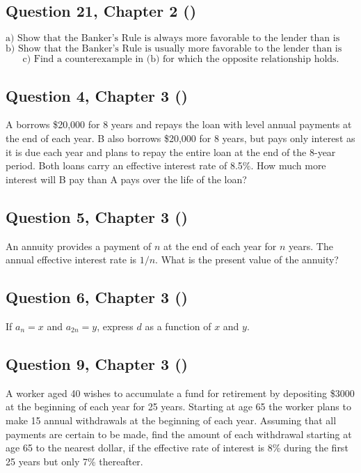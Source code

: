 \documentclass[12pt, a4paper]{article}
\begin{document}
    \bigskip


\subsection*{Question 21, Chapter 2 (\cite{toi3rd})}
\[
\text{a) Show that the Banker’s Rule is always more favorable to the lender than is exact simple interest.}
\]
\[
\text{b) Show that the Banker’s Rule is usually more favorable to the lender than is ordinary simple interest.}
\]
\[
\text{c) Find a counterexample in (b) for which the opposite relationship holds.}
\]

\subsection*{Question 4, Chapter 3  (\cite{toi3rd})}
A borrows \$20,000 for 8 years and repays the loan with level annual payments at the end of each year. 
B also borrows \$20,000 for 8 years, but pays only interest as it is due each year and plans to repay the entire loan at the end of the 8-year period. 
Both loans carry an effective interest rate of 8.5\%. 
How much more interest will B pay than A pays over the life of the loan?

\subsection*{Question 5, Chapter 3  (\cite{toi3rd})}
An annuity provides a payment of $n$ at the end of each year for $n$ years. 
The annual effective interest rate is $1/n$. 
What is the present value of the annuity?

\subsection*{Question 6, Chapter 3  (\cite{toi3rd})}
If $a_n = x$ and $a_{2n} = y$, express $d$ as a function of $x$ and $y$.

\subsection*{Question 9, Chapter 3  (\cite{toi3rd})}
A worker aged 40 wishes to accumulate a fund for retirement by depositing \$3000 at the beginning of each year for 25 years. 
Starting at age 65 the worker plans to make 15 annual withdrawals at the beginning of each year. 
Assuming that all payments are certain to be made, find the amount of each withdrawal starting at age 65 to the nearest dollar, if the effective rate of interest is 8\% during the first 25 years but only 7\% thereafter.
\end{document}
